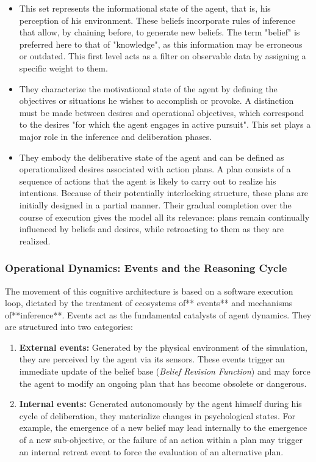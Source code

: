 \documentclass{article}
\begin{document}
\begin{itemize}
\item[\textbf{Beliefs (Beliefs):}] This set represents the informational state of the agent, that is, his perception of his environment. These beliefs incorporate rules of inference that allow, by chaining before, to generate new beliefs. The term "belief" is preferred here to that of "knowledge", as this information may be erroneous or outdated. This first level acts as a filter on observable data by assigning a specific weight to them.
    
\item[\textbf{Desires (Désirs):}] They characterize the motivational state of the agent by defining the objectives or situations he wishes to accomplish or provoke. A distinction must be made between desires and operational objectives, which correspond to the desires "for which the agent engages in active pursuit". This set plays a major role in the inference and deliberation phases.
    
\item[\textbf{Intentions (Intentions):}] They embody the deliberative state of the agent and can be defined as operationalized desires associated with action plans. A plan consists of a sequence of actions that the agent is likely to carry out to realize his intentions. Because of their potentially interlocking structure, these plans are initially designed in a partial manner. Their gradual completion over the course of execution gives the model all its relevance: plans remain continually influenced by beliefs and desires, while retroacting to them as they are realized.
\end{itemize}
\subsubsection{Operational Dynamics: Events and the Reasoning Cycle}

The movement of this cognitive architecture is based on a software execution loop, dictated by the treatment of ecosystems of** events** and mechanisms of**inference**. Events act as the fundamental catalysts of agent dynamics. They are structured into two categories:

\begin{enumerate}
\item \textbf {External events:} Generated by the physical environment of the simulation, they are perceived by the agent via its sensors. These events trigger an immediate update of the belief base (\textit{Belief Revision Function}) and may force the agent to modify an ongoing plan that has become obsolete or dangerous.
\item \textbf {Internal events:} Generated autonomously by the agent himself during his cycle of deliberation, they materialize changes in psychological states. For example, the emergence of a new belief may lead internally to the emergence of a new sub-objective, or the failure of an action within a plan may trigger an internal retreat event to force the evaluation of an alternative plan.
\end{enumerate}
\end{document}

